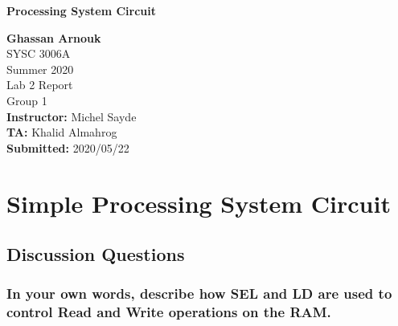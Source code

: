 \documentclass{article}
\begin{document}
	\begin{titlepage}
		\begin{center}
			\vspace{1cm}
			{\LARGE\textbf{Processing System Circuit}}

			\vspace{1.5cm}
			\textbf{\large Ghassan Arnouk}\\
			
			\vspace{1cm}
			\large SYSC 3006A\\
			\large Summer 2020\\
			\large Lab 2 Report\\
			\large Group 1\\
			
						
			\vspace{2cm}
			\textbf{Instructor:} Michel Sayde\\
			
			\vspace{0.1cm}
			\textbf{TA:} Khalid Almahrog\\
			
			\vspace{0.1cm}
			\textbf{Submitted:} 2020/05/22\\			
		\end{center}
	\end{titlepage}
	
	\pagebreak
	
	\section{Simple Processing System Circuit}
	\subsection{Discussion Questions}
	\subsubsection {In your own words, describe how SEL and LD are used to control Read and Write operations on the RAM.}
	
\end{document}
